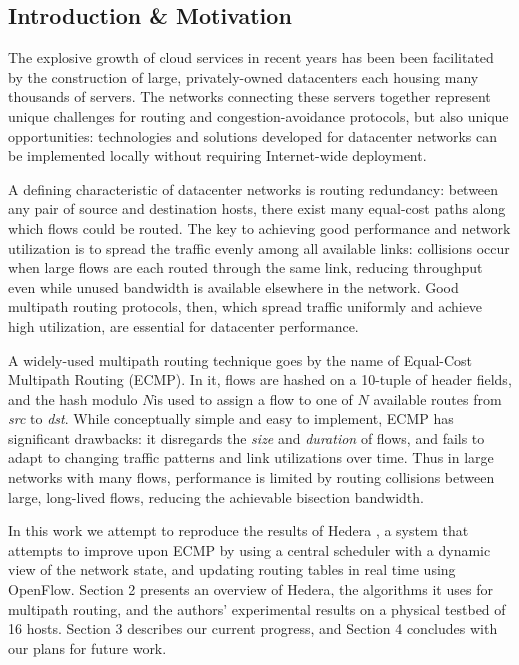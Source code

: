 \documentclass[11pt]{article}
\begin{document}
\begin{multicols}{2}

\section{Introduction \& Motivation}
The explosive growth of cloud services in recent years has been been facilitated by the construction of large, privately-owned datacenters each housing many thousands of servers. The networks connecting these servers together represent unique challenges for routing and congestion-avoidance protocols, but also unique opportunities: technologies and solutions developed for datacenter networks can be implemented locally without requiring Internet-wide deployment.

A defining characteristic of datacenter networks is routing redundancy: between any pair of source and destination hosts, there exist many equal-cost paths along which flows could be routed. The key to achieving good performance and network utilization is to spread the traffic evenly among all available links: collisions occur when large flows are each routed through the same link, reducing throughput even while unused bandwidth is available elsewhere in the network. Good multipath routing protocols, then, which spread traffic uniformly and achieve high utilization, are essential for datacenter performance.

A widely-used multipath routing technique goes by the name of Equal-Cost Multipath Routing (ECMP). In it, flows are hashed on a 10-tuple of header fields, and the hash modulo $N $is used to assign a flow to one of $N$ available routes from \textit{src} to \textit{dst}. While conceptually simple and easy to implement, ECMP has significant drawbacks: it disregards the \textit{size} and \textit{duration} of flows, and fails to adapt to changing traffic patterns and link utilizations over time. Thus in large networks with many flows, performance is limited by routing collisions between large, long-lived flows, reducing the achievable bisection bandwidth.

In this work we attempt to reproduce the results of Hedera \cite{Hedera}, a system that attempts to improve upon ECMP by using a central scheduler with a dynamic view of the network state, and updating routing tables in real time using OpenFlow. Section 2 presents an overview of Hedera, the algorithms it uses for multipath routing, and the authors' experimental results on a physical testbed of 16 hosts. Section 3 describes our current progress, and Section 4 concludes with our plans for future work.


\end{multicols}
\end{document}
